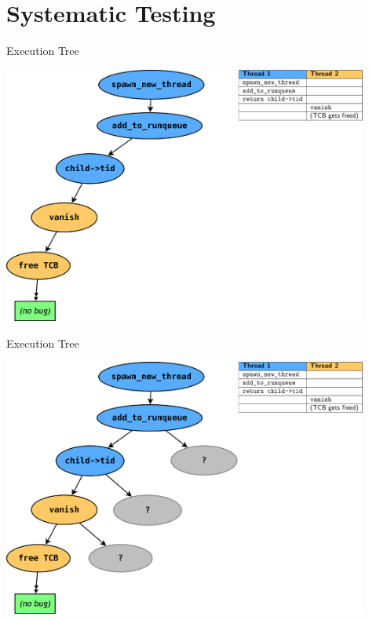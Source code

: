 \documentclass[xcolor=dvipsnames]{beamer}
\begin{document}

\section{Systematic Testing}


\begin{frame}{Execution Tree}
	\begin{center}
		\includegraphics[width=0.9\textwidth]{threadfork0.png}
	\end{center}
\end{frame}
\begin{frame}{Execution Tree}
	\begin{center}
		\includegraphics[width=0.9\textwidth]{threadfork05.png}
	\end{center}
\end{frame}
\end{document}
